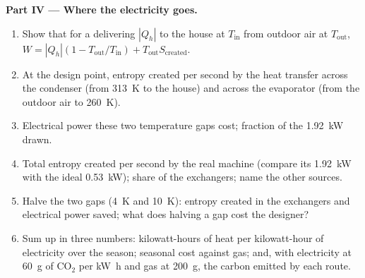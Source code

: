 \begin{problem}
\medskip
\noindent\textbf{Part IV --- Where the electricity goes.}
\begin{enumerate}[resume]
  \item Show that for a  delivering $|Q_h|$ to the house at
        $T_{\mathrm{in}}$ from outdoor air at $T_{\mathrm{out}}$,
        $W = |Q_h|(1 - T_{\mathrm{out}}/T_{\mathrm{in}}) + T_{\mathrm{out}}S_{\mathrm{created}}$.
  \item At the design point, entropy created per second by the heat
        transfer across the condenser (from \qty{313}{K} to the house) and
        across the evaporator (from the outdoor air to \qty{260}{K}).
  \item Electrical power these two temperature gaps cost; fraction of
        the \qty{1.92}{kW} drawn.
  \item Total entropy created per second by the real machine (compare
        its \qty{1.92}{kW} with the ideal \qty{0.53}{kW}); share of the
        exchangers; name the other sources.
  \item Halve the two gaps (\qty{4}{K} and \qty{10}{K}): entropy created
        in the exchangers and electrical power saved; what does halving
        a gap cost the designer?
  \item Sum up in three numbers: kilowatt-hours of heat per
        kilowatt-hour of electricity over the season; seasonal cost
        against gas; and, with electricity at \qty{60}{g} of CO$_2$ per
        \unit{kW h} and gas at \qty{200}{g}, the carbon emitted by each
        route.
\end{enumerate}
\end{problem}
